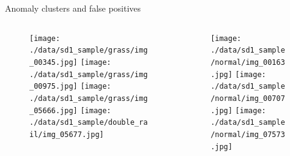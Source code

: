 \documentclass[aspectratio=169]{beamer}
\begin{document}
\begin{frame}{Anomaly clusters and false positives}
    \begin{columns}
        \begin{column}{0.45\textwidth}
            \begin{figure}
                \centering
                \texttt{[image: ./data/sd1\_sample/grass/img\_00345.jpg]}
                \texttt{[image: ./data/sd1\_sample/grass/img\_00975.jpg]}
                \texttt{[image: ./data/sd1\_sample/grass/img\_05666.jpg]}
                \texttt{[image: ./data/sd1\_sample/double\_rail/img\_05677.jpg]}
            \end{figure}
        \end{column}
        \begin{column}{0.45\textwidth}
            \begin{figure}
                \centering
                \texttt{[image: ./data/sd1\_sample/normal/img\_00163.jpg]}
                \texttt{[image: ./data/sd1\_sample/normal/img\_00707.jpg]}
                \texttt{[image: ./data/sd1\_sample/normal/img\_07573.jpg]}
            \end{figure}
        \end{column}
    \end{columns}
\end{frame}
\end{document}
